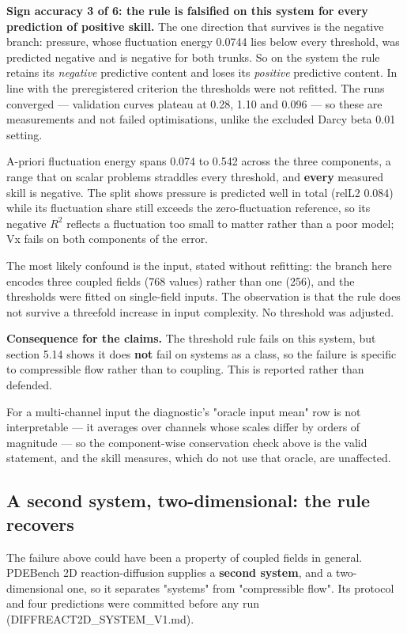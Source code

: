 \documentclass[preprint,12pt]{elsarticle}
\begin{document}
\textbf{Sign accuracy 3 of 6: the rule is falsified on this system for every prediction of positive skill.} The one direction that survives is the negative branch: pressure, whose fluctuation energy 0.0744 lies below every threshold, was predicted negative and is negative for both trunks. So on the system the rule retains its \emph{negative} predictive content and loses its \emph{positive} predictive content. In line with the preregistered criterion the thresholds were not refitted. The runs converged --- validation curves plateau at 0.28, 1.10 and 0.096 --- so these are measurements and not failed optimisations, unlike the excluded Darcy beta 0.01 setting.

A-priori fluctuation energy spans 0.074 to 0.542 across the three components, a range that on scalar problems straddles every threshold, and \textbf{every} measured skill is negative. The split shows pressure is predicted well in total (relL2 0.084) while its fluctuation share still exceeds the zero-fluctuation reference, so its negative $R^2$ reflects a fluctuation too small to matter rather than a poor model; Vx fails on both components of the error.

The most likely confound is the input, stated without refitting: the branch here encodes three coupled fields (768 values) rather than one (256), and the thresholds were fitted on single-field inputs. The observation is that the rule does not survive a threefold increase in input complexity. No threshold was adjusted.

\textbf{Consequence for the claims.} The threshold rule fails on this system, but section 5.14 shows it does \textbf{not} fail on systems as a class, so the failure is specific to compressible flow rather than to coupling. This is reported rather than defended.

For a multi-channel input the diagnostic's "oracle input mean" row is not interpretable --- it averages over channels whose scales differ by orders of magnitude --- so the component-wise conservation check above is the valid statement, and the skill measures, which do not use that oracle, are unaffected.

\subsection{A second system, two-dimensional: the rule recovers}

The failure above could have been a property of coupled fields in general. PDEBench 2D reaction-diffusion supplies a \textbf{second system}, and a two-dimensional one, so it separates "systems" from "compressible flow". Its protocol and four predictions were committed before any run (DIFFREACT2D\_SYSTEM\_V1.md).
\end{document}
